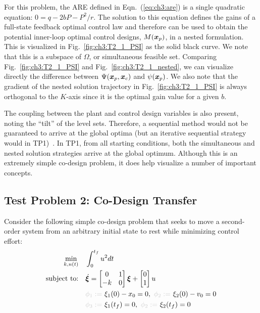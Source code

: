 For this problem, the ARE defined in Eqn.~(\ref{eq:ch3:are}) is a single quadratic equation: $0 = q - 2 b P - P^2/r$. The solution to this equation defines the gains of a full-state feedback optimal control law and therefore can be used to obtain the potential inner-loop optimal control designs, $M(\bm{x}_p)$, in a nested formulation. This is visualized in Fig.~\ref{fig:ch3:T2_1_PSI} as the solid black curve. We note that this is a subspace of $\Omega$, or simultaneous feasible set.
Comparing Fig.~\ref{fig:ch3:T2_1_PSI} and Fig.~\ref{fig:ch3:T2_1_nested}, we can visualize directly the difference between $\Psi(\bm{x}_p,\bm{x}_c)$ and $\psi(\bm{x}_p)$. We also note that the gradient of the nested solution trajectory in Fig.~\ref{fig:ch3:T2_1_PSI} is always orthogonal to the $K$-axis since it is the optimal gain value for a given $b$. 

The coupling between the plant and control design variables is also present, noting the ``tilt'' of the level sets. Therefore, a sequential method would not be guaranteed to arrive at the global optima (but an iterative sequential strategy would in TP1)~\cite{Fathy2001a}.
In TP1, from all starting conditions, both the simultaneous and nested solution strategies arrive at the global optimum.
Although this is an extremely simple co-design problem, it does help visualize a number of important concepts.



\subsection{Test Problem 2: Co-Design Transfer \label{sec:ch3:transfer}}

Consider the following simple co-design problem that seeks to move a second-order system from an arbitrary initial state to rest while minimizing control effort:
\begin{subequations}
\begin{align}
\min_{k,u(t)} \quad & \int_{0}^{t_f} u^2 dt \\
\text{subject to:} \quad & \dot{\bxi} = \begin{bmatrix} 0 & 1 \\ -k & 0 \end{bmatrix}\bxi + \begin{bmatrix} 0 \\ 1 \end{bmatrix} u \\
& \textcolor{light-gray}{\phi_1 := }\ \xi_1(0) - x_0 = 0, \ \textcolor{light-gray}{\phi_2 := }\  \xi_2(0) - v_0 = 0 \\
& \textcolor{light-gray}{\phi_3 := }\ \xi_1(t_f) = 0, \ \textcolor{light-gray}{\phi_2 := }\  \xi_2(t_f) = 0
\end{align}
\end{subequations}

